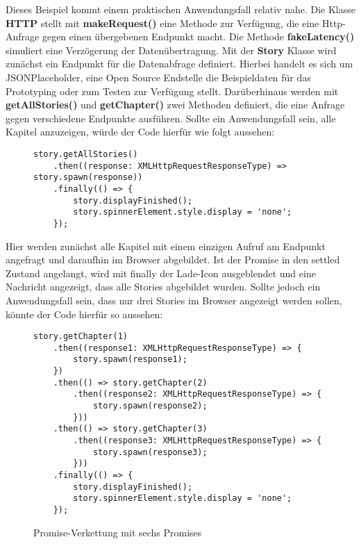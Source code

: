 \noindent
Dieses Beispiel kommt einem praktischen Anwendungsfall relativ nahe. Die Klasse \textbf{HTTP} stellt mit  \textbf{makeRequest()} eine Methode zur Verfügung, die eine Http-Anfrage gegen einen übergebenen Endpunkt macht. Die Methode \textbf{fakeLatency()} simuliert eine Verzögerung der Datenübertragung. Mit der \textbf{Story} Klasse wird zunächst ein Endpunkt für die Datenabfrage definiert. Hierbei handelt es sich um JSONPlaceholder, eine Open Source Endstelle die Beispieldaten für das Prototyping oder zum Testen zur Verfügung stellt. Darüberhinaus werden mit \textbf{getAllStories()} und \textbf{getChapter()} zwei Methoden definiert, die eine Anfrage gegen verschiedene Endpunkte ausführen. Sollte ein Anwendungsfall sein, alle Kapitel anzuzeigen, würde der Code hierfür wie folgt aussehen:

\begin{figure}[H]
\begin{lstlisting}
story.getAllStories()
    .then((response: XMLHttpRequestResponseType) => story.spawn(response))
    .finally(() => {
        story.displayFinished();
        story.spinnerElement.style.display = 'none';
    });
\end{lstlisting}
\end{figure}

\noindent
Hier werden zunächst alle Kapitel mit einem einzigen Aufruf am Endpunkt angefragt und daraufhin im Browser abgebildet. Ist der Promise in den settled Zustand angelangt, wird mit finally der Lade-Icon ausgeblendet und eine Nachricht angezeigt, dass alle Stories abgebildet wurden. Sollte jedoch ein Anwendungsfall sein, dass nur drei Stories im Browser angezeigt werden sollen, könnte der Code hierfür so aussehen: 

\begin{figure}[H]
\begin{lstlisting}
story.getChapter(1)
    .then((response1: XMLHttpRequestResponseType) => {
        story.spawn(response1);
    })
    .then(() => story.getChapter(2)
        .then((response2: XMLHttpRequestResponseType) => {
            story.spawn(response2);
        }))
    .then(() => story.getChapter(3)
        .then((response3: XMLHttpRequestResponseType) => {
            story.spawn(response3);
        }))
    .finally(() => {
        story.displayFinished();
        story.spinnerElement.style.display = 'none';
    });
\end{lstlisting}
\caption{Promise-Verkettung mit sechs Promises}
\end{figure}

